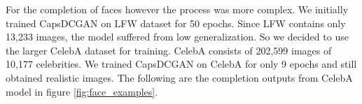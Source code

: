 For the completion of faces however the process was more complex. We initially trained CapsDCGAN on LFW dataset \cite{lfw} for 50 epochs. Since LFW contains only 13,233 images, the model suffered from low generalization. So we decided to use the larger CelebA dataset \cite{celeba} for training. CelebA consists of 202,599 images of 10,177 celebrities. We trained CapsDCGAN on CelebA for only 9 epochs and still obtained realistic images. The following are the completion outputs from CelebA model in figure \ref{fig:face_examples}.
\begin{figure}[H]
    \centering
    \\
    \centering
    \\
    \centering

\end{figure}

